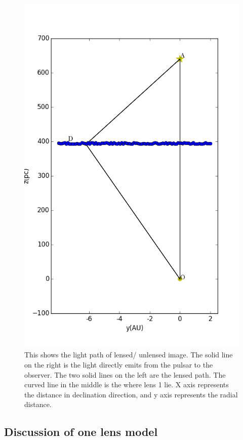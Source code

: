\documentclass[useAMS,usenatbib]{mn2e}
\begin{document}
\begin{figure}
\centering
\includegraphics[width=1.0\linewidth, angle=0]{One_lens_light_path.png}
\caption{This shows the light path of lensed/ unlensed image. The solid line on the right is the light directly emits from the pulsar to the observer. The two solid lines on the left are the lensed path. The curved line in the middle is the where lens 1 lie. X axis represents the distance in declination direction, and y axis represents the radial distance.}
\label{OneLensLightPath}
\end{figure}


\subsection{Discussion of one lens model}
\end{document}
